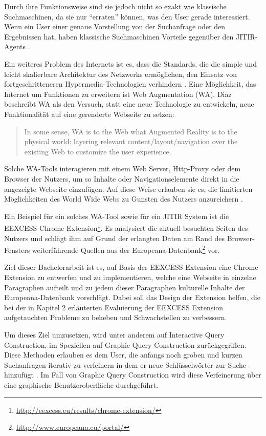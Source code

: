 Durch ihre Funktionsweise sind sie jedoch nicht so exakt wie klassische Suchmaschinen, da sie nur ``erraten'' können, was den User gerade interessiert. Wenn ein User einer genaue Vorstellung von der Suchanfrage oder den Ergebnissen hat, haben klassische Suchmaschinen Vorteile gegenüber den JITIR-Agents \cite{rhodes2000just}.

Ein weiteres Problem des Internets ist es, dass die Standards, die die simple und leicht skalierbare Architektur des Netzwerks ermöglichen, den Einsatz von fortgeschritteneren Hypermedia-Technologien verhindern \cite{bouvin1999unifying}. Eine Möglichkeit, das Internet um Funktionen zu erweitern ist Web Augmentation (WA). Diaz \cite{diaz2012understanding} beschreibt WA als den Versuch, statt eine neue Technologie zu entwickeln, neue Funktionalität auf eine gerenderte Webseite zu setzen:
\begin{quote}
In some sense, WA is to the Web what Augmented Reality is to the physical world: layering relevant content/layout/navigation over the existing Web to customize the user experience. \cite{diaz2012understanding}
\end{quote}
Solche WA-Tools interagieren mit einem Web Server, Http-Proxy oder dem Browser der Nutzers, um so Inhalte oder Navigationselemente direkt in die angezeigte Webseite einzufügen. Auf diese Weise erlauben sie es, die limitierten Möglichkeiten des World Wide Webs zu Gunsten des Nutzers anzureichern \cite{anderson1997integrating}.

Ein Beispiel für ein solches WA-Tool sowie für ein JITIR System ist die EEXCESS Chrome Extension\footnote{\url{http://eexcess.eu/results/chrome-extension/}}. Es analysiert die aktuell besuchten Seiten des Nutzers und schlägt ihm auf Grund der erlangten Daten am Rand des Browser-Fensters weiterführende Quellen aus der Europeana-Datenbank\footnote{\url{http://www.europeana.eu/portal/}} vor.

Ziel dieser Bachelorarbeit ist es, auf Basis der EEXCESS Extension eine Chrome Extension zu entwerfen und zu implementieren, welche eine Webseite in einzelne Paragraphen aufteilt und zu jedem dieser Paragraphen kulturelle Inhalte der Europeana-Datenbank vorschlägt. Dabei soll das Design der Extension helfen, die bei der in Kapitel 2 erläuterten Evaluierung der EEXCESS Extension aufgetauchten Probleme zu beheben und Schwachstellen zu verbessern.

Um dieses Ziel umzusetzen, wird unter anderem auf Interactive Query Construction, im Speziellen auf Graphic Query Construction zurückgegriffen. Diese Methoden erlauben es dem User, die anfangs noch groben und kurzen Suchanfragen iterativ zu verfeinern \cite{goldman1999interactive} in dem er neue Schlüsselwörter zur Suche hinzufügt \cite{ruthven2003re}. Im Fall von Graphic Query Construction wird diese Verfeinerung über eine graphische Benutzeroberfläche durchgeführt.

